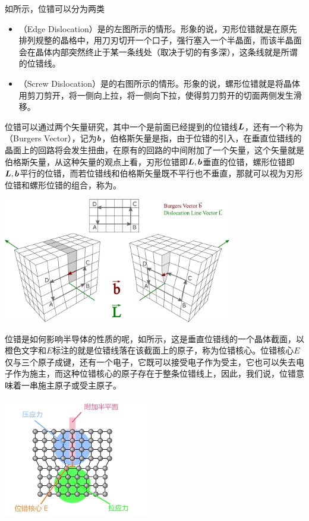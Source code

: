 如所示\cite{W7}，位错可以分为两类
\begin{itemize}
    \item {}（Edge Dislocation）是的左图所示的情形。形象的说，刃形位错就是在原先排列规整的晶格中，用刀刃切开一个口子，强行塞入一个半晶面，而该半晶面会在晶体内部突然终止于某一条线处（取决于切的有多深），这条线就是所谓的位错线。
    \item {}（Screw Dislocation）是的右图所示的情形。形象的说，螺形位错就是将晶体用剪刀剪开，将一侧向上拉，将一侧向下拉，使得剪刀剪开的切面两侧发生滑移。
\end{itemize}
位错可以通过两个矢量研究，其中一个是前面已经提到的位错线$\vb*{L}$，还有一个称为（Burgers Vector），记为$\vb*{b}$，伯格斯矢量是指，由于位错的引入，在垂直位错线的晶面上的回路将会发生扭曲，在原有的回路的中间附加了一个矢量，这个矢量就是伯格斯矢量，从这种矢量的观点上看，刃形位错即$\vb*{L},\vb*{b}$垂直的位错，螺形位错即$\vb*{L},\vb*{b}$平行的位错，而若位错线和伯格斯矢量既不平行也不垂直，那就可以视为刃形位错和螺形位错的组合，称为。

\begin{Figure}[位错的分类]
    \includegraphics[width=10cm]{image/Burgers_Vector_and_dislocations.pdf}
\end{Figure}

位错是如何影响半导体的性质的呢，如所示\cite{W8}，这是垂直位错线的一个晶体截面，以橙色文字和$E$标注的就是位错线落在该截面上的原子，称为位错核心。位错核心$E$仅与三个原子成键，还有一个电子，它既可以接受电子作为受主，它也可以失去电子作为施主，而这种位错核心的原子存在于整条位错线上，因此，我们说，位错意味着一串施主原子或受主原子。
\begin{Figure}[位错的影响]
    \includegraphics[width=6.5cm]{image/Versetzung_im_2D-Kristall.pdf}
\end{Figure}

